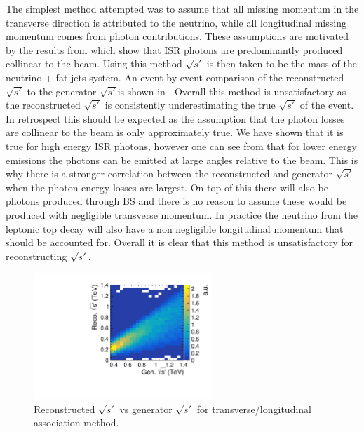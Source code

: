 The simplest method attempted was to assume that all missing momentum in the transverse direction is attributed to the neutrino, while all longitudinal missing momentum comes from photon contributions. These assumptions are motivated by the results from  which show that \ac{ISR} photons are predominantly produced collinear to the beam. Using this method $\sqrt{s'}$ is then taken to be the mass of the neutrino + fat jets system. An event by event comparison of the reconstructed $\sqrt{s'}$ to the generator $\sqrt{s'}$is shown in . Overall this method is unsatisfactory as the reconstructed $\sqrt{s'}$ is consistently underestimating the true $\sqrt{s'}$ of the event. In retrospect this should be expected as the assumption that the photon losses are collinear to the beam is only approximately true. We have shown that it is true for high energy \ac{ISR} photons, however one can see from  that for lower energy emissions the photons can be emitted at large angles relative to the beam. This is why there is a stronger correlation between the reconstructed and generator $\sqrt{s'}$ when the photon energy losses are largest. On top of this there will also be photons produced through \ac{BS} and there is no reason to assume these would be produced with negligible transverse momentum. In practice the neutrino from the leptonic top decay will also have a non negligible longitudinal momentum that should be accounted for. Overall it is clear that this method is unsatisfactory for reconstructing $\sqrt{s'}$.

\begin{figure}
  \centering
  \includegraphics[width=0.6\textwidth]{TopAnalysis/figures/CrudeEVsTrueE.pdf}
  \caption[Reconstructed $\sqrt{s'}$ vs generator $\sqrt{s'}$ for transverse/longitudinal association method]{Reconstructed $\sqrt{s'}$ vs generator $\sqrt{s'}$ for transverse/longitudinal association method.}
  \label{fig:simpleAssoication}
\end{figure}

